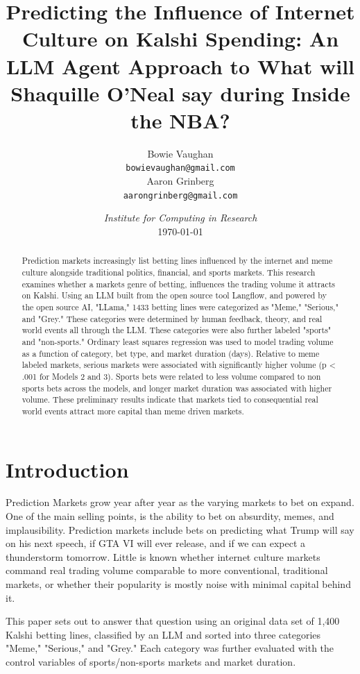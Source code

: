 \documentclass{article}
\title{Predicting the Influence of Internet Culture on Kalshi Spending: An LLM Agent Approach to What will Shaquille O'Neal say during Inside the NBA?}
\author{
    Bowie Vaughan \\
    \texttt{bowievaughan@gmail.com} \\
    \And
    Aaron Grinberg \\
    \texttt{aarongrinberg@gmail.com} \\
}
\date{\textit{Institute for Computing in Research} \\[4mm] \today}
\begin{document}
\maketitle

\begin{abstract}
	Prediction markets increasingly list betting lines influenced by the internet and meme culture alongside traditional politics, financial, and sports markets. This research examines whether a markets genre of betting, influences the trading volume it attracts on Kalshi. Using an LLM built from the open source tool Langflow, and powered by the open source AI, "LLama," 1433 betting lines were categorized as "Meme," "Serious," and "Grey." These categories were determined by human feedback, theory, and real world events all through the LLM. These categories were also further labeled "sports" and "non-sports." Ordinary least squares regression was used to model trading volume as a function of category, bet type, and market duration (days). Relative to meme labeled markets, serious markets were associated with significantly higher volume (p < .001 for Models 2 and 3). Sports bets were related to less volume compared to non sports bets across the models, and longer market duration was associated with higher volume. These preliminary results indicate that markets tied to consequential real world events attract more capital than meme driven markets. 
\end{abstract}



\section{Introduction}
Prediction Markets grow year after year as the varying markets to bet on expand. One of the main selling points, is the ability to bet on absurdity, memes, and implausibility. Prediction markets include bets on predicting what Trump will say on his next speech, if GTA VI will ever release, and if we can expect a thunderstorm tomorrow. Little is known whether internet culture markets command real trading volume comparable to more conventional, traditional markets, or whether their popularity is mostly noise with minimal capital behind it. 

This paper sets out to answer that question using an original data set of 1,400 Kalshi betting lines, classified by an LLM and sorted into three categories "Meme," "Serious," and "Grey." Each category was further evaluated with the control variables of sports/non-sports markets and market duration.
\end{document}
